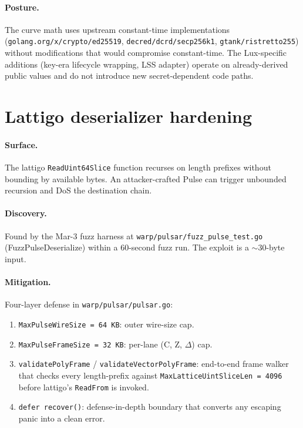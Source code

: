\documentclass[11pt,a4paper]{article}
\begin{document}
\paragraph{Posture.} The curve math uses upstream constant-time implementations (\texttt{golang.org/x/crypto/ed25519}, \texttt{decred/dcrd/secp256k1}, \texttt{gtank/ristretto255}) without modifications that would compromise constant-time. The Lux-specific additions (key-era lifecycle wrapping, LSS adapter) operate on already-derived public values and do not introduce new secret-dependent code paths.

\section{Lattigo deserializer hardening}

\paragraph{Surface.} The lattigo \texttt{ReadUint64Slice} function recurses on length prefixes without bounding by available bytes. An attacker-crafted Pulse can trigger unbounded recursion and DoS the destination chain.

\paragraph{Discovery.} Found by the Mar-3 fuzz harness at \texttt{warp/pulsar/fuzz\_pulse\_test.go} (FuzzPulseDeserialize) within a 60-second fuzz run. The exploit is a $\sim 30$-byte input.

\paragraph{Mitigation.} Four-layer defense in \texttt{warp/pulsar/pulsar.go}:
\begin{enumerate}[leftmargin=2em,nosep]
  \item \texttt{MaxPulseWireSize = 64 KB}: outer wire-size cap.
  \item \texttt{MaxPulseFrameSize = 32 KB}: per-lane (C, Z, $\Delta$) cap.
  \item \texttt{validatePolyFrame} / \texttt{validateVectorPolyFrame}: end-to-end frame walker that checks every length-prefix against \texttt{MaxLatticeUintSliceLen = 4096} before lattigo's \texttt{ReadFrom} is invoked.
  \item \texttt{defer recover()}: defense-in-depth boundary that converts any escaping panic into a clean error.
\end{enumerate}
\end{document}
